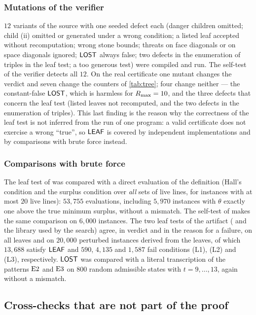 \subsubsection*{Mutations of the verifier}
$12$ variants of the source with one seeded defect each (danger children omitted; child (ii) omitted or
generated under a wrong condition; a listed leaf accepted without recomputation; wrong stone bounds;
threats on face diagonals or on space diagonals ignored; $\mathsf{LOST}$ always false; two defects in the
enumeration of triples in the leaf test; a too generous \VOID{} test) were compiled and run. The
self-test of the verifier detects all $12$. On the real certificate one mutant changes the verdict and seven change the
counters of \cref{tab:tree}; four change neither --- the constant-false $\mathsf{LOST}$, which is harmless for
$R_{\max}=10$, and the three defects that concern the leaf test (listed leaves not recomputed, and the two
defects in the enumeration of triples). This last finding is the reason why the correctness of the
leaf test is not inferred from the run of one program: a valid certificate does not exercise a wrong
``true'', so $\mathsf{LEAF}$ is covered by independent implementations and by comparisons with brute force instead.

\subsubsection*{Comparisons with brute force}
The leaf test of  was compared with a direct evaluation of the definition (Hall's condition
and the surplus condition over \emph{all} sets of live lines, for instances with at most $20$ live
lines): $53{,}755$ evaluations, including $5{,}970$ instances with $\theta$ exactly one above the true
minimum surplus, without a mismatch. The self-test of  makes the same comparison on $6{,}000$
instances. The two leaf tests of the artifact ( and the library used by the search) agree,
in verdict and in the reason for a failure, on all leaves and on $20{,}000$ perturbed instances derived
from the leaves, of which $13{,}688$ satisfy $\mathsf{LEAF}$ and $590$, $4{,}135$ and $1{,}587$ fail
conditions (L1), (L2) and (L3), respectively. $\mathsf{LOST}$ was compared with a literal transcription of the
patterns $\mathrm{E2}$ and $\mathrm{E3}$ on $800$ random admissible states with $t=9,\dots,13$, again without a mismatch.

\subsection{Cross-checks that are not part of the proof}\label{ssec:cross}

